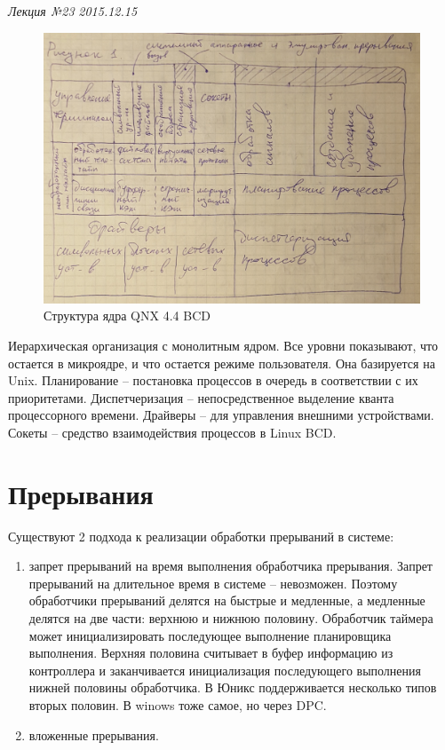 \clearpage
\begin{flushright}
	\textit{Лекция №23}
	\textit{2015.12.15}
\end{flushright}

\begin{figure}[H]
    \centering
    \includegraphics[width=\textwidth]{pic/1.png}
    \caption{Структура ядра QNX 4.4 BCD}
\end{figure}

Иерархическая организация с монолитным ядром. Все уровни показывают, что остается в микроядре, и что остается режиме пользователя. Она базируется на Unix.
Планирование – постановка процессов в очередь в соответствии с их приоритетами.
Диспетчеризация – непосредственное выделение кванта процессорного времени.
Драйверы – для управления внешними устройствами.
Сокеты – средство взаимодействия процессов в Linux BCD.

\chapter{Прерывания}

Существуют 2 подхода к реализации обработки прерываний в системе:
\begin{enumerate}
    \item запрет прерываний на время выполнения обработчика прерывания. Запрет прерываний на длительное время в системе – невозможен. Поэтому обработчики прерываний делятся на быстрые и медленные, а медленные делятся на две части: верхнюю и нижнюю половину. Обработчик таймера может инициализировать последующее выполнение планировщика выполнения. Верхняя половина считывает в буфер информацию из контроллера и заканчивается инициализация последующего выполнения нижней половины обработчика. В Юникс поддерживается несколько типов вторых половин. В winows тоже самое, но через DPC.
    \item вложенные прерывания.
\end{enumerate} 

